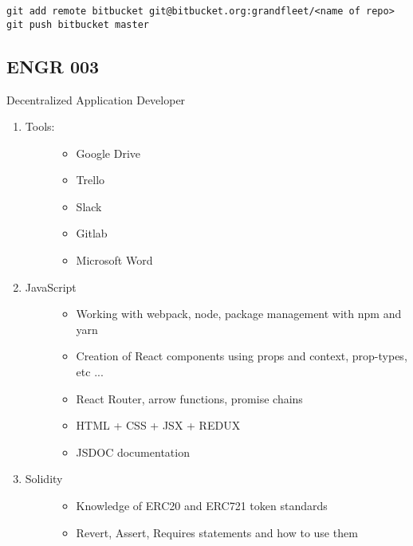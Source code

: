 \begin{verbatim}
git add remote bitbucket git@bitbucket.org:grandfleet/<name of repo>
git push bitbucket master
\end{verbatim}


\subsection{ENGR 003}\label{engr-003}

Decentralized Application Developer

\begin{enumerate}
\def\labelenumi{\arabic{enumi}.}
\item
  \begin{description}
  \item[Tools:]
  \begin{itemize}
  \tightlist
  \item
    Google Drive
  \item
    Trello
  \item
    Slack
  \item
    Gitlab
  \item
    Microsoft Word
  \end{itemize}
  \end{description}
\item
  \begin{description}
  \item[JavaScript]
  \begin{itemize}
  \tightlist
  \item
    Working with webpack, node, package management with npm and yarn
  \item
    Creation of React components using props and context, prop-types,
    etc ...
  \item
    React Router, arrow functions, promise chains
  \item
    HTML + CSS + JSX + REDUX
  \item
    JSDOC documentation
  \end{itemize}
  \end{description}
\item
  \begin{description}
  \item[Solidity]
  \begin{itemize}
  \tightlist
  \item
    Knowledge of ERC20 and ERC721 token standards
  \item
    Revert, Assert, Requires statements and how to use them

\end{itemize}
\end{description}
\end{enumerate}
